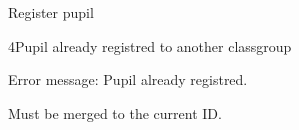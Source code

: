 \begin{uc}{Register pupil}


        \begin{uc-ext}

        \begin{uc-fail}{4}{Pupil already registred to another classgroup}
        \item Error message: Pupil already registred.
        \item Must be merged to the current ID.
        \end{uc-fail}

        \end{uc-ext}

\end{uc}
